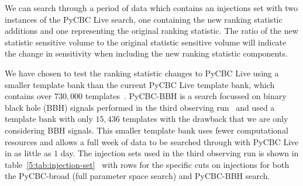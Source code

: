 We can search through a period of data which contains an injections set with two instances of the PyCBC Live search, one containing the new ranking statistic additions and one representing the original ranking statistic. The ratio of the new statistic sensitive volume to the original statistic sensitive volume will indicate the change in sensitivity when including the new ranking statistic components.

We have chosen to test the ranking statistic changes to PyCBC Live using a smaller template bank than the current PyCBC Live template bank, which contains over $730,000$ templates~\cite{PyCBC_Live:2018}. PyCBC-BBH is a search focussed on binary black hole (BBH) signals performed in the third observing run~\cite{gwtc3:2023, PyCBC_focussed_bbh:2024} and used a template bank with only $15,436$ templates with the drawback that we are only considering BBH signals. This smaller template bank uses fewer computational resources and allows a full week of data to be searched through with PyCBC Live in as little as $1$ day. The injection sets used in the third observing run is shown in table~\ref{5:tab:injection-set}~\cite{gwtc3:2023} with rows for the specific cuts on injections for both the PyCBC-broad (full parameter space search) and PyCBC-BBH search.
